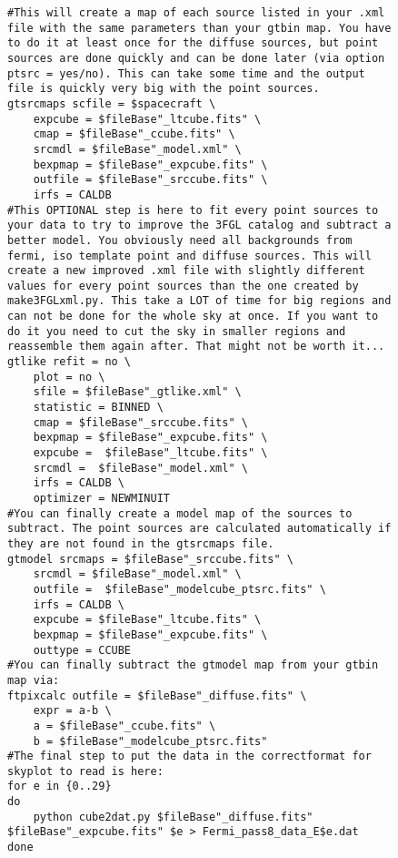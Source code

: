 \begin{figure}
\begin{lstlisting}
#This will create a map of each source listed in your .xml file with the same parameters than your gtbin map. You have to do it at least once for the diffuse sources, but point sources are done quickly and can be done later (via option ptsrc = yes/no). This can take some time and the output file is quickly very big with the point sources.
gtsrcmaps scfile = $spacecraft \
    expcube = $fileBase"_ltcube.fits" \
    cmap = $fileBase"_ccube.fits" \
    srcmdl = $fileBase"_model.xml" \
    bexpmap = $fileBase"_expcube.fits" \
    outfile = $fileBase"_srccube.fits" \
    irfs = CALDB
#This OPTIONAL step is here to fit every point sources to your data to try to improve the 3FGL catalog and subtract a better model. You obviously need all backgrounds from fermi, iso template point and diffuse sources. This will create a new improved .xml file with slightly different values for every point sources than the one created by make3FGLxml.py. This take a LOT of time for big regions and can not be done for the whole sky at once. If you want to do it you need to cut the sky in smaller regions and reassemble them again after. That might not be worth it...
gtlike refit = no \
	plot = no \
	sfile = $fileBase"_gtlike.xml" \
	statistic = BINNED \
	cmap = $fileBase"_srccube.fits" \
	bexpmap = $fileBase"_expcube.fits" \
	expcube =  $fileBase"_ltcube.fits" \
	srcmdl =  $fileBase"_model.xml" \
	irfs = CALDB \
	optimizer = NEWMINUIT
#You can finally create a model map of the sources to subtract. The point sources are calculated automatically if they are not found in the gtsrcmaps file.
gtmodel srcmaps = $fileBase"_srccube.fits" \
	srcmdl = $fileBase"_model.xml" \
	outfile =  $fileBase"_modelcube_ptsrc.fits" \
	irfs = CALDB \
	expcube = $fileBase"_ltcube.fits" \
	bexpmap = $fileBase"_expcube.fits" \
	outtype = CCUBE
#You can finally subtract the gtmodel map from your gtbin map via:
ftpixcalc outfile = $fileBase"_diffuse.fits" \
    expr = a-b \
    a = $fileBase"_ccube.fits" \
    b = $fileBase"_modelcube_ptsrc.fits"
#The final step to put the data in the correctformat for skyplot to read is here:
for e in {0..29}
do 
    python cube2dat.py $fileBase"_diffuse.fits" $fileBase"_expcube.fits" $e > Fermi_pass8_data_E$e.dat
done
\end{lstlisting}

\end{figure}